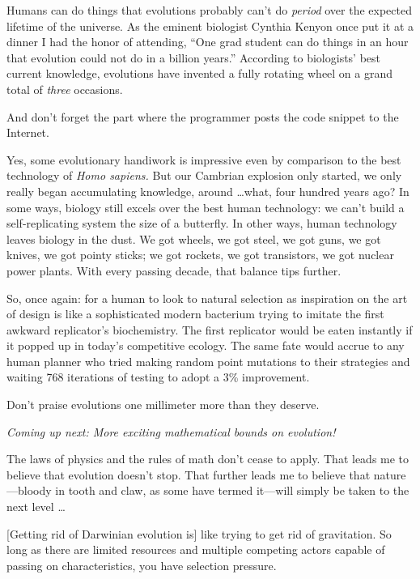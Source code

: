 {
 Humans can do things that evolutions probably
can't do \textit{period} over the expected lifetime of
the universe. As the eminent biologist Cynthia Kenyon once put it at a
dinner I had the honor of attending, ``One grad
student can do things in an hour that evolution could not do in a
billion years.'' According to
biologists' best current knowledge, evolutions have
invented a fully rotating wheel on a grand total of \textit{three}
occasions.}

{
 And don't forget the part where the programmer
posts the code snippet to the Internet.}

{
 Yes, some evolutionary handiwork is impressive even by comparison
to the best technology of \textit{Homo sapiens.} But our Cambrian
explosion only started, we only really began accumulating knowledge,
around \ldots what, four hundred years ago? In some ways, biology still
excels over the best human technology: we can't build a
self-replicating system the size of a butterfly. In other ways, human
technology leaves biology in the dust. We got wheels, we got steel, we
got guns, we got knives, we got pointy sticks; we got rockets, we got
transistors, we got nuclear power plants. With every passing decade,
that balance tips further.}

{
 So, once again: for a human to look to natural selection as
inspiration on the art of design is like a sophisticated modern
bacterium trying to imitate the first awkward
replicator's biochemistry. The first replicator would
be eaten instantly if it popped up in today's
competitive ecology. The same fate would accrue to any human planner
who tried making random point mutations to their strategies and waiting
768 iterations of testing to adopt a 3\% improvement.}

{
 Don't praise evolutions one millimeter more than
they deserve.}

{
 \textit{Coming up next: More exciting mathematical bounds on
evolution!}}

\myendsectiontext


\bigskip


{
 The laws of physics and the rules of math don't
cease to apply. That leads me to believe that evolution
doesn't stop. That further leads me to believe that
nature---bloody in tooth and claw, as some have termed it---will simply
be taken to the next level \ldots}

{
 [Getting rid of Darwinian evolution is] like trying to get rid of
gravitation. So long as there are limited resources and multiple
competing actors capable of passing on characteristics, you have
selection pressure.}

